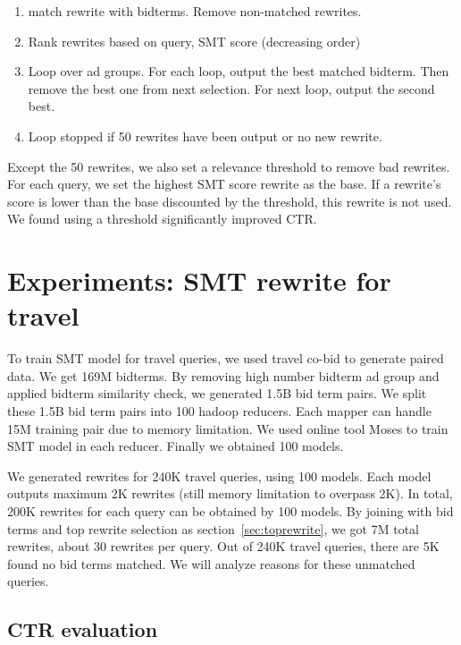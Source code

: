 \documentclass{sig-alternate}
\begin{document}
\begin{enumerate}
\item match rewrite with bidterms. Remove non-matched  rewrites.
\item Rank rewrites based on query, SMT score (decreasing order)
\item Loop over ad groups. For each loop, output the best matched bidterm. Then remove the best one from next selection. For next loop, output the second best.
\item Loop stopped if 50 rewrites have been output or no new rewrite.
\end{enumerate} 

Except the 50 rewrites, we also set a relevance threshold to remove bad rewrites. For each query, we set the highest SMT score rewrite as the base. If a rewrite's score is lower than the base discounted by the threshold, this rewrite is not used. We found using a threshold significantly improved CTR.


\section{Experiments: SMT rewrite for travel}
To train SMT model for travel queries, we used travel co-bid to generate paired data. We get 169M bidterms. By removing high number bidterm ad group and applied bidterm similarity check,  we generated 1.5B bid term pairs. We split these 1.5B bid term pairs into 100 hadoop reducers. Each mapper can handle 15M training pair due to memory limitation. We used online tool Moses to train SMT model in each reducer. Finally we obtained 100 models. 

We generated rewrites for 240K travel queries, using 100 models. Each model outputs maximum 2K rewrites (still memory limitation to overpass 2K). In total, 200K rewrites for each query can be obtained by 100 models.   By joining with bid terms and top rewrite selection as section~\ref{sec:toprewrite}, we got 7M total rewrites, about 30 rewrites per query. Out of 240K travel queries, there are 5K found no bid terms matched. We will analyze reasons for these unmatched queries.

\subsection{CTR evaluation}
\end{document}
